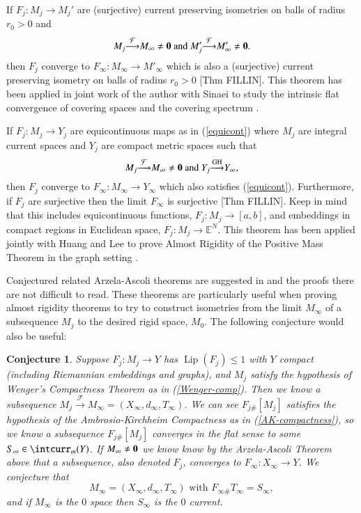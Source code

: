\documentclass[12pt]{amsart}
\newtheorem{conj}[thm]{Conjecture}
\begin{document}
If $F_j: M_j \to M_j'$ are (surjective) current preserving isometries on balls
of radius $r_0>0$ and 
\begin{equation}
M_j {\stackrel {\mathcal{F}}{\longrightarrow} } M_\infty\neq {\bf{0}} \textrm{ and } M'_j {\stackrel {\mathcal{F}}{\longrightarrow} } M'_\infty\neq {\bf{0}}.
\end{equation}
then $F_j$ converge to $F_\infty: M_\infty\to M'_\infty$ which is also
a (surjective) current preserving isometry on balls
of radius $r_0>0$ \cite{Sormani-AA}[Thm FILLIN].  This theorem has been applied
in joint work of the author with Sinaei to study the intrinsic flat convergence
of covering spaces and the covering spectrum \cite{Sinaei-Sormani-1}.

If $F_j: M_j \to Y_j$ are equicontinuous maps as in (\ref{equicont})
where $M_j$ are integral current spaces and $Y_j$ are compact
metric spaces such that
\begin{equation}
M_j {\stackrel {\mathcal{F}}{\longrightarrow} } M_\infty\neq {\bf{0}} \textrm{ and } Y_j {\stackrel { \textrm{GH}}{\longrightarrow} } Y_\infty,
\end{equation}
then $F_j$ converge to $F_\infty: M_\infty\to Y_\infty$ 
which also satisfies (\ref{equicont}).  Furthermore, if $F_j$ are surjective
then the limit $F_\infty$ is surjective \cite{Sormani-AA}[Thm FILLIN].   
Keep in mind that
this includes equicontinuous functions, $F_j : M_j \to [a,b]$, and embeddings
in compact regions in Euclidean space, $F_j: M_j \to \mathbb{E}^N$.
This theorem has been applied jointly with Huang and Lee to prove
Almost Rigidity of the Positive Mass Theorem in the graph setting \cite{HLS}.

Conjectured related Arzela-Ascoli theorems
are suggested in \cite{Sormani-AA} and the 
proofs there are not difficult to read.  These theorems are particularly
useful when proving almost rigidity theorems to try to construct
isometries from the limit $M_\infty$ of a subsequence $M_j$ to the
desired rigid space, $M_0$.  The following conjecture would also be useful:

\begin{conj}
Suppose $F_j: M_j \to Y$ has ${\operatorname{Lip}}(F_j) \le 1$ with $Y$ compact
(including Riemannian embeddings
and graphs), and $M_j$ satisfy the hypothesis of
Wenger's Compactness Theorem as in (\ref{Wenger-comp}).
Then we know a subsequence 
$M_j {\stackrel {\mathcal{F}}{\longrightarrow} } M_\infty=(X_\infty, d_\infty, T_\infty)$.
We can see $F_{j\#}[M_j]$ satisfies the hypothesis of the Ambrosio-Kirchheim
Compactness as in (\ref{AK-compactness}),   
so we know a subsequence
$F_{j\#}[M_j]$ converges in the flat sense to some $S_\infty\in \intcurr_m(Y)$.
If $M_\infty\neq {\bf{0}}$
we know know by the Arzela-Ascoli Theorem above that a subsequence,
also denoted $F_j$, converges to $F_\infty: X_\infty \to Y$.
We conjecture that
\begin{equation} \label{images-flat-converge}
M_\infty=(X_\infty, d_\infty, T_\infty) \textrm { with } F_{\infty\#} T_\infty=S_\infty,
\end{equation}
and if $M_\infty$ is the $0$ space then $S_\infty$ is the $0$ current.
\end{conj}
\end{document}

